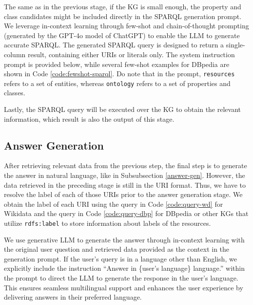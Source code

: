 The same as in the previous stage, if the KG is small enough, the property and class candidates might be included directly in the SPARQL generation prompt. We leverage in-context learning through few-shot and chain-of-thought prompting (generated by the GPT-4o model of ChatGPT) to enable the LLM to generate accurate SPARQL. The generated SPARQL query is designed to return a single-column result, containing either URIs or literals only. The system instruction prompt is provided below, while several few-shot examples for DBpedia are shown in Code \ref{code:fewshot-sparql}. Do note that in the prompt, \texttt{resources} refers to a set of entities, whereas \texttt{ontology} refers to a set of properties and classes.\\
\promptEight



Lastly, the SPARQL query will be executed over the KG to obtain the relevant information, which result is also the output of this stage. 


\subsection{Answer Generation}
After retrieving relevant data from the previous step, the final step is to generate the answer in natural language, like in Subsubsection \ref{answer-gen}. However, the data retrieved in the preceding stage is still in the URI format. Thus, we have to resolve the label of each of those URIs prior to the answer generation stage. We obtain the label of each URI using the query in Code \ref{code:query-wd} for Wikidata and the query in Code \ref{code:query-dbp} for DBpedia or other KGs that utilize \texttt{rdfs:label} to store information about labels of the resources.





We use generative LLM to generate the answer through in-context learning with the original user question and retrieved data provided as the context in the generation prompt. If the user’s query is in a language other than English, we explicitly include the instruction ``Answer in \{user's language\} language.'' within the prompt to direct the LLM to generate the response in the user’s language. This ensures seamless multilingual support and enhances the user experience by delivering answers in their preferred language.

